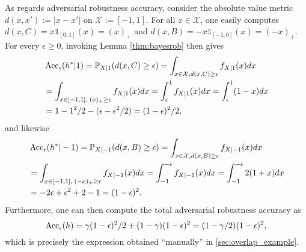 As regards adversarial robustness accuracy, consider  the absolute value metric
$d(x,x'):=|x-x'|$ on $\mathcal X:=[-1,1]$. For all $x \in \mathcal X$, one
easily computes $d(x,C)=x\mathbb
1_{[0,1]}(x)=(x)_+$ and $d(x,B)=-x\mathbb 1_{[-1, 0]}(x)=(-x)_+$.
For every $\epsilon \ge 0$, invoking Lemma \ref{thm:bayesrob} then gives 
\begin{eqnarray*}
  \begin{split}
    &\operatorname{Acc}_\epsilon(h^*|1)=\mathbb P_{X|1}(d(x,C) \ge \epsilon)=\int_{x \in \mathcal X,
      d(x,C)\ge\epsilon}f_{X|1}(x)dx\\
    &=\int_{x \in [-1, 1],\;(x)_+\ge\epsilon}f_{X|1}(x)dx
    =\int_{\epsilon}^1f_{X|1}(x)dx=\int_{\epsilon}^1(1-x)dx\\
    &=1-1^2/2 - (\epsilon - \epsilon^2/2)= (1-\epsilon)^2/2,
\end{split}
  \end{eqnarray*}
and likewise
\begin{eqnarray*}
  \begin{split}  
    &\operatorname{Acc}_\epsilon(h^*|-1)=\mathbb P_{X|-1}(d(x,B) \ge \epsilon)=\int_{x \in
      \mathcal X, d(x,B)\ge\epsilon}f_{X|-1}(x)dx\\
    &=\int_{x \in [-1, 1],\;(-x)_+\ge\epsilon}f_{X|-1}(x)dx
    =\int_{-1}^{-\epsilon}f_{X|-1}(x)dx=\int_{-1}^{-\epsilon}2(1+x)dx\\
    &= -2\epsilon+\epsilon^2+2-1 = (1-\epsilon)^2.
\end{split}
\end{eqnarray*}
Furthermore, one can then compute the total adversarial robustness accuracy as
$$\operatorname{Acc}_\epsilon(h)=\gamma(1-\epsilon)^2/2 + (1  - \gamma)(1-\epsilon)^2
=(1-\gamma/2)(1-\epsilon)^2,
$$
which is precisely the expression obtained ``manually'' in
\ref{sec:overlap_example}.

